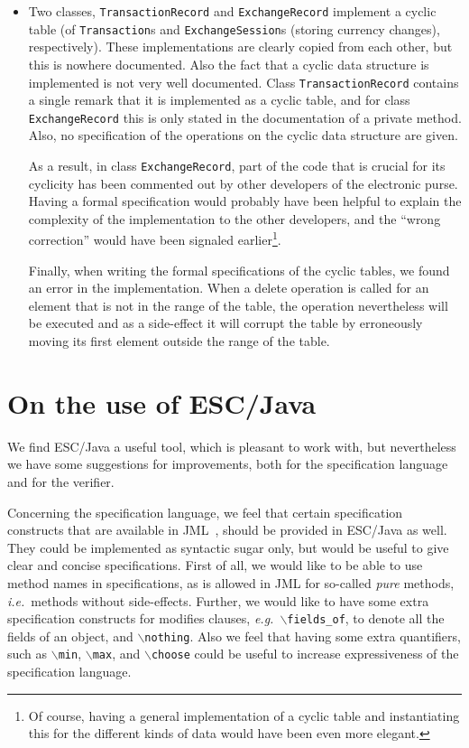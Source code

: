 \documentclass[a4paper]{llncs}
\newcommand{\noth}{\(\backslash\)\texttt{nothing}}
\newcommand{\fieldsof}{\(\backslash\)\texttt{fields\_of}}
\begin{document}
\begin{itemize}
\item Two classes, \texttt{TransactionRecord} and
\texttt{ExchangeRecord} implement a cyclic table (of
\texttt{Transaction}s and
\texttt{ExchangeSession}s (storing currency changes),
respectively).  These implementations are clearly copied from each
other, but this is nowhere documented. Also the fact that a
cyclic data structure is implemented is not very well documented. Class
\texttt{TransactionRecord} contains a single remark that it is
implemented as a cyclic table, and for class
\texttt{ExchangeRecord} this is only stated in the documentation of a
private method. Also, no specification of the operations on the cyclic
data structure are given.

As a result, in class \texttt{ExchangeRecord}, part of the code that
is crucial for its cyclicity has been commented out by other
developers of the electronic purse. Having a formal specification
would probably have been helpful to explain the complexity of the
implementation to the other developers, and the ``wrong correction''
would have been signaled earlier\footnote{Of course, having a general 
implementation of a cyclic table and instantiating this for the
different kinds of data would have been even more elegant.}.

Finally, when writing the formal specifications of the cyclic tables,
we found an error in the implementation. When a delete operation is
called for an element that is not in the range of the table, the
operation nevertheless will be executed and as a side-effect it will
corrupt the table by erroneously moving its first element outside the
range of the table.
\end{itemize}


\section{On the use of ESC/Java}
\label{SectESC}
We find ESC/Java a useful tool, which is pleasant to work with, but
nevertheless we have some suggestions for improvements, both for the
specification language and for the verifier.

Concerning the specification language, we feel that certain
specification constructs that are available in JML~\cite{LeavensBR99},
should be provided in ESC/Java as well. They could be implemented as
syntactic sugar only, but would be useful to give clear and concise
specifications.  First of all, we would like to be able to use method
names in specifications, as is allowed in JML for so-called
\emph{pure} methods, \emph{i.e.}~methods without
side-effects. Further, we would like to have some extra specification
constructs for modifies clauses, \emph{e.g.}~\fieldsof, to denote all
the fields of an object, and \noth. Also we feel that having some
extra quantifiers, such as \texttt{\(\backslash\)min},
\texttt{\(\backslash\)max}, and \texttt{\(\backslash\)choose} could be 
useful to increase expressiveness of the specification language.
\end{document}
